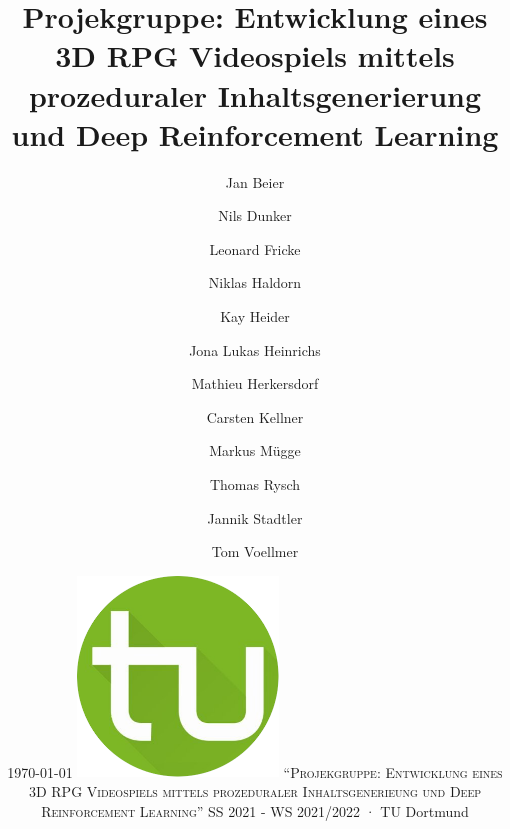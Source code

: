 %
%
\newcommand\svperson{Jan Beier, Nils Dunker, Leonard Fricke, Niklas Haldorn, Kay Heider, \linebreak Jona Lukas Heinrichs, Mathieu Herkersdorf, Carsten Kellner, Markus Mügge, Thomas Rysch, Jannik Stadtler, Tom Voellmer}
\newcommand\svdatum{\today} %
\newcommand\lvname{Projekgruppe: Entwicklung eines 3D RPG Videospiels mittels prozeduraler Inhaltsgenerieung und Deep Reinforcement Learning}
\newcommand\lvtyp{SS 2021 - WS 2021/2022}
\newcommand\lvinst{TU Dortmund}



	
	\title{ \huge\textbf{Projekgruppe: \linebreak \linebreak Entwicklung eines 3D RPG Videospiels mittels prozeduraler Inhaltsgenerierung und Deep Reinforcement Learning} }
	\author{Jan Beier \and Nils Dunker \and Leonard Fricke \and Niklas Haldorn \and Kay Heider \and Jona Lukas Heinrichs \and Mathieu Herkersdorf \and Carsten Kellner \and Markus Mügge \and Thomas Rysch \and Jannik Stadtler \and Tom Voellmer}
	\date{\LARGE{\svdatum} \linebreak \linebreak \normalsize \centering \includegraphics[width=0.4\textwidth]{ressources/tu-dortmund.png} \linebreak \linebreak \large\textsc{"`\lvname"'} \linebreak \linebreak \large{\lvtyp} · \large{\lvinst}}
	
	\maketitle
	\thispagestyle{empty} %
